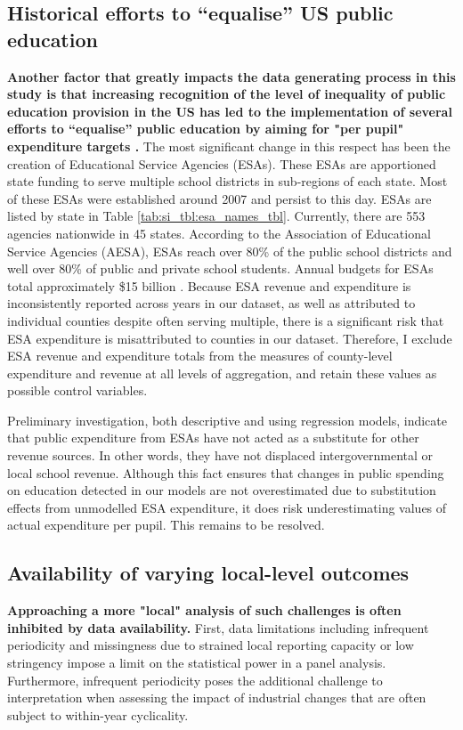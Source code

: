 \subsection{Historical efforts to ``equalise'' US public education}
\textbf{Another factor that greatly impacts the data generating process in this study is that increasing recognition of the level of inequality of public education provision in the US has led to the implementation of several efforts to ``equalise'' public education by aiming for "per pupil" expenditure targets \cite{skinnerStateLocalFinancing2019}.} The most significant change in this respect has been the creation of Educational Service Agencies (ESAs). These ESAs are apportioned state funding to serve multiple school districts in sub-regions of each state. Most of these ESAs were established around 2007 and persist to this day. ESAs are listed by state in Table \ref{tab:si_tbl:esa_names_tbl}. Currently, there are 553 agencies nationwide in 45 states. According to the Association of Educational Service Agencies (AESA), ESAs reach over 80\% of the public school districts and well over 80\% of public and private school students. Annual budgets for ESAs total approximately \$15 billion \cite{aesaAESA2024}. Because ESA revenue and expenditure is inconsistently reported across years in our dataset, as well as attributed to individual counties despite often serving multiple, there is a significant risk that ESA expenditure is misattributed to counties in our dataset. Therefore, I exclude ESA revenue and expenditure totals from the measures of county-level expenditure and revenue at all levels of aggregation, and retain these values as possible control variables.

Preliminary investigation, both descriptive and using regression models, indicate that public expenditure from ESAs have not acted as a substitute for other revenue sources. In other words, they have not displaced intergovernmental or local school revenue. Although this fact ensures that changes in public spending on education detected in our models are not overestimated due to substitution effects from unmodelled ESA expenditure, it does risk underestimating values of actual expenditure per pupil. This remains to be resolved.

\subsection{Availability of varying local-level outcomes}

\textbf{Approaching a more "local" analysis of such challenges is often inhibited by data availability.} First, data limitations including infrequent periodicity and missingness due to strained local reporting capacity or low stringency impose a limit on the statistical power in a panel analysis. Furthermore, infrequent periodicity poses the additional challenge to interpretation when assessing the impact of industrial changes that are often subject to within-year cyclicality. 

